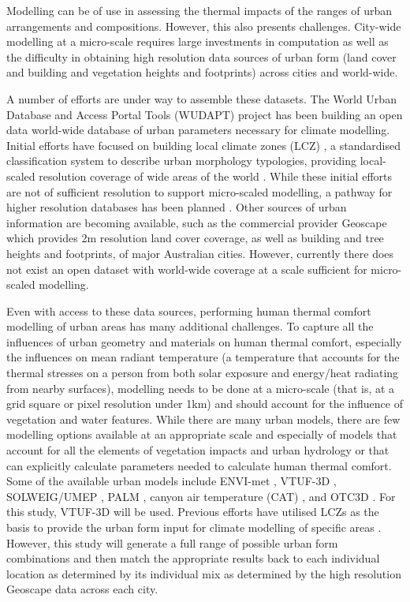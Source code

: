 \documentclass[final,3p,times,authoryear]{elsarticle}
\begin{document}
Modelling can be of use in assessing the thermal impacts of the ranges of urban arrangements and compositions. However, this also presents challenges. City-wide modelling at a micro-scale requires large investments in computation as well as the difficulty in obtaining high resolution data sources of urban form (land cover and building and vegetation heights and footprints) across cities and world-wide.

A number of efforts are under way to assemble these datasets. The World Urban Database and Access Portal Tools (WUDAPT) project \citep{Ching2018a} has been building an open data world-wide database of urban parameters necessary for climate modelling. Initial efforts have focused on building local climate zones (LCZ) \citep{Stewart2012b}, a standardised classification system to describe urban morphology typologies, providing local-scaled resolution coverage of wide areas of the world \citep{Demuzere2019}. While these initial efforts are not of sufficient resolution to support micro-scaled modelling, a pathway for higher resolution databases has been planned \citep{Ching2019}. Other sources of urban information are becoming available, such as the commercial provider Geoscape \citep{Geoscape2020} which provides 2m resolution land cover coverage, as well as building and tree heights and footprints, of major Australian cities. However, currently there does not exist an open dataset with world-wide coverage at a scale sufficient for micro-scaled modelling.

Even with access to these data sources, performing human thermal comfort modelling of urban areas has many additional challenges. To capture all the influences of urban geometry and materials on human thermal comfort, especially the influences on mean radiant temperature \citep{Kantor2011} (a temperature that accounts for the thermal stresses on a person from both solar exposure and energy/heat radiating from nearby surfaces), modelling needs to be done at a micro-scale (that is, at a grid square or pixel resolution under 1km) and should account for the influence of vegetation and water features. While there are many urban models, there are few modelling options available at an appropriate scale and especially of models that account for all the elements of vegetation impacts and urban hydrology or that can explicitly calculate parameters needed to calculate human thermal comfort. Some of the available urban models include ENVI-met \citep{Bruse1999}, VTUF-3D \citep{Nice2018a}, SOLWEIG/UMEP \citep{Lindberg2018}, PALM \citep{Dominik2019}, canyon air temperature (CAT) \citep{Erell2006}, and OTC3D \citep{Nazarian2018}. For this study, VTUF-3D will be used. Previous efforts have utilised LCZs as the basis to provide the urban form input for climate modelling of specific areas \citep{stewart2014eval,Verdonck2018,Hammerberg2018,Masson2020,Emery2021}. However, this study will generate a full range of possible urban form combinations and then match the appropriate results back to each individual location as determined by its individual mix as determined by the high resolution Geoscape data across each city. 
\end{document}
